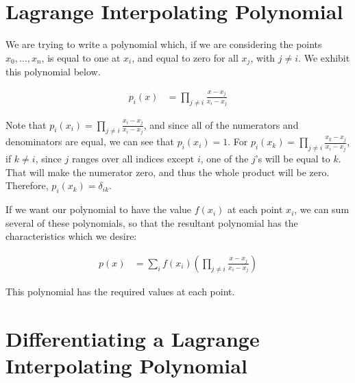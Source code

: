 \documentclass{article}
\begin{document}
\section{Lagrange Interpolating Polynomial}

We are trying to write a polynomial which, if we are considering
	the points $x_0, \dots, x_n$, is equal to one at $x_i$,
	and equal to zero for all $x_j$, with $j \neq i$.
We exhibit this polynomial below.

\begin{align}
p_i(x) & = \prod_{j \neq i} \frac{x - x_j}{x_i - x_j}
\end{align}

Note that $p_i(x_i) = \prod_{j \neq i} \frac{x_i - x_j}{x_i - x_j}$,
	and since all of the numerators and denominators are equal,
	we can see that $p_i(x_i) = 1$.
For $p_i(x_k) = \prod_{j \neq i} \frac{x_k - x_j}{x_i - x_j}$,
	if $k \neq i$, since $j$ ranges over all indices except $i$,
	one of the $j$'s will be equal to $k$.
That will make the numerator zero, and thus the whole product
	will be zero.
Therefore, $p_i(x_k) = \delta_{ik}$.

If we want our polynomial to have the value $f(x_i)$ at each
	point $x_i$, we can sum several of these polynomials, so that
	the resultant polynomial has the characteristics which we desire:

\begin{align}
p(x) & = \sum_i f(x_i) 
	\left( \prod_{j \neq i} \frac{x-x_j}{x_i-x_j} \right)
\end{align}

This polynomial has the required values at each point.

\section{Differentiating a Lagrange Interpolating Polynomial}
\end{document}
